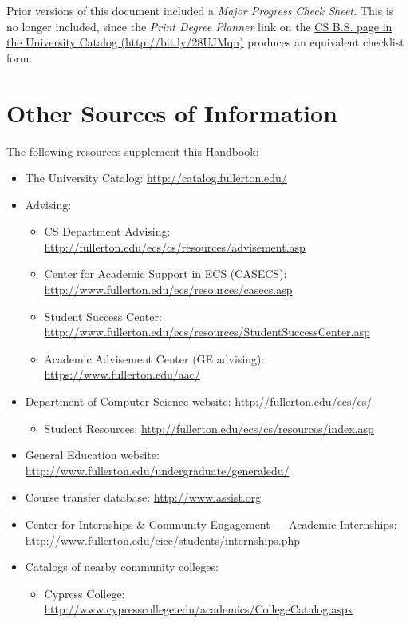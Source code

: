 \documentclass{book}
\begin{document}
Prior versions of this document included a \emph{Major Progress Check Sheet.} This is no longer included, since the \emph{Print Degree Planner} link on the \href{http://catalog.fullerton.edu/preview_program.php?catoid=2&poid=537&returnto=137}{CS B.S. page in the University Catalog (\url{http://bit.ly/28UJMqn})} produces an equivalent checklist form.

\chapter{Other Sources of Information}

The following resources supplement this Handbook:
\begin{itemize}
\item The University Catalog: \url{http://catalog.fullerton.edu/}
\item Advising:
  \begin{itemize}
    \item CS Department Advising: \url{http://fullerton.edu/ecs/cs/resources/advisement.asp}
  \item Center for Academic Support in ECS (CASECS): \url{http://www.fullerton.edu/ecs/resources/casecs.asp}
  \item Student Success Center: \url{http://www.fullerton.edu/ecs/resources/StudentSuccessCenter.asp}
    \item Academic Advisement Center (GE advising): \url{https://www.fullerton.edu/aac/}
    \end{itemize}
\item Department of Computer Science website: \url{http://fullerton.edu/ecs/cs/}
  \begin{itemize}
  \item Student Resources: \url{http://fullerton.edu/ecs/cs/resources/index.asp}
  \end{itemize}
\item General Education website: \url{http://www.fullerton.edu/undergraduate/generaledu/}
\item Course transfer database: \url{http://www.assist.org}
\item Center for Internships \& Community Engagement --- Academic Internships: \url{http://www.fullerton.edu/cice/students/internships.php}
\item Catalogs of nearby community colleges:
  \begin{itemize}
    \item Cypress College: \url{http://www.cypresscollege.edu/academics/CollegeCatalog.aspx}

\end{itemize}
\end{itemize}
\end{document}
